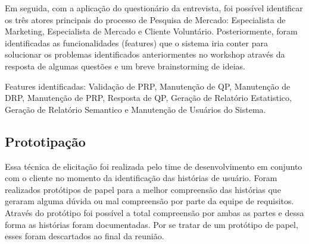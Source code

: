 		Em seguida, com a aplicação do questionário da entrevista, foi possível identificar os três atores principais do processo de Pesquisa de Mercado: Especialista de Marketing, Especialista de Mercado e Cliente Voluntário. Posteriormente, foram identificadas as funcionalidades (features) que o sistema iria conter para solucionar os problemas identificados anteriormentes no workshop através da resposta de algumas questões e um breve brainstorming de ideias.
	
		Features identificadas: Validação de PRP, Manutenção de QP, Manutenção de DRP, Manutenção de PRP, Resposta de QP, Geração de Relatório Estatistico, Geração de Relatório Semantico e Manutenção de Usuários do Sistema.

	\subsection{Prototipação}

		Essa técnica de elicitação foi realizada pelo time de desenvolvimento em conjunto com o cliente no momento da identificação das histórias de usuário. Foram realizados protótipos de papel para a melhor compreensão das histórias que geraram alguma dúvida ou mal compreensão por parte da equipe de requisitos. Através do protótipo foi possível a total compreensão por ambas as partes e dessa forma as histórias foram documentadas. Por se tratar de um protótipo de papel, esses foram descartados ao final da reunião.
